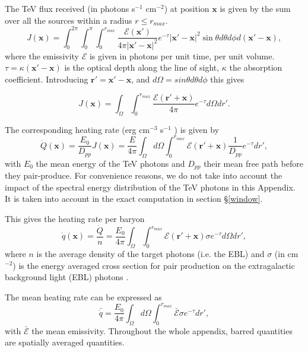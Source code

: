 \documentclass[twocolumns]{emulateapj}
\begin{document}
{The TeV flux received (in photons s$^{-1}$ cm$^{-2}$) at position $\mathbf{x}$ is given by the sum over all the sources within a radius $r\leqslant r_{max}$.
\begin{equation}
  \label{eq:flux_recu0}
  J(\mathbf{x})=\int_{0}^{2\pi}\int_{0}^{\pi}\int_0^{r_{max}}   \frac{\mathcal{E}(\mathbf{x}') }{4\pi |\mathbf{x}'-\mathbf{x}|^2} e^{-\tau} |\mathbf{x}'-\mathbf{x}|^2 \sin\theta d\theta d\phi d(\mathbf{x}'-\mathbf{x}),
\end{equation}
where the emissivity $\mathcal{E}$ is given in photons per unit time, per unit volume. $\tau=\kappa (\mathbf{x}'-\mathbf{x})$ is the optical depth along the line of sight, $\kappa$ the absorption coefficient.
Introducing $\mathbf{r'}=\mathbf{x}'-\mathbf{x}$, and $d\Omega=sin\theta d\theta d\phi$ this gives


\begin{equation}
  \label{eq:flux_recu}
  J(\mathbf{x})=\int_{\Omega}\int_0^{r_{max}}   \frac{\mathcal{E}(\mathbf{r}'+\mathbf{x}) }{4\pi } e^{-\tau} d\Omega dr'.
\end{equation}

The corresponding heating rate (erg cm$^{-3}$ s$^{-1}$ ) is given by 
\begin{equation}
  \label{eq:heating_rate0}
  \dot{Q}(\mathbf{x})=\frac{E_0}{D_{pp}}J(\mathbf{x}) =\frac{E}{4\pi}   \int_{\Omega}d\Omega\int_0^{r_{max}}   \mathcal{E}(\mathbf{r}'+\mathbf{x}) \frac{1}{D_{pp}}  e^{-\tau} dr' ,
\end{equation}
with $E_0$ the mean energy of the TeV photons and $D_{pp}$ their mean free path  before they pair-produce. For convenience reasons,  we  do not take into account the impact of the spectral energy distribution of the TeV photons in this Appendix. It is taken into account in the exact computation in section \S\ref{window}.

This gives the  heating rate per baryon
\begin{equation}
  \label{eq:heating_rate0}
  \dot{q}(\mathbf{x})=\frac{\dot{Q}}{n}= \frac{E_0}{4\pi}  \int_{\Omega}\int_0^{r_{max}}   \mathcal{E}(\mathbf{r}'+\mathbf{x})\sigma  e^{-\tau}d\Omega dr' ,
\end{equation}
where $n$ is the average density of the target photons (i.e. the EBL) and $\sigma$ (in cm$^{-2}$) is the energy averaged cross section for pair production on the extragalactic background light (EBL) photons \citep{1967PhRv..155.1408G}. 


The mean heating rate can be expressed as
\begin{equation}
  \label{eq:heating_rate0}
  \bar{\dot{q}}=\frac{E_0}{4\pi} \int_{\Omega}d\Omega\int_0^{r_{max}}  \bar{\mathcal{E}}\sigma  e^{-\tau}dr', 
\end{equation}
with $\bar{\mathcal{E}}$ the mean emissivity. Throughout the whole appendix, barred quantities are spatially averaged quantities.

}
\end{document}

